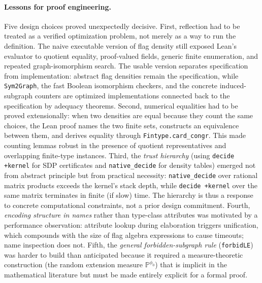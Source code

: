 \documentclass{article}
\newcommand{\lean}[1]{\texttt{#1}}
\begin{document}
\paragraph{Lessons for proof engineering.}
Five design choices proved unexpectedly decisive.  First, reflection had to be
treated as a verified optimization problem, not merely as a way to run the
definition.  The naive executable version of flag density still exposed
Lean's evaluator to quotient equality, proof-valued fields, generic finite
enumeration, and repeated graph-isomorphism search.  The usable version
separates specification from implementation: abstract flag densities remain the
specification, while \lean{Sym2Graph}, the fast Boolean isomorphism checkers,
and the concrete induced-subgraph counters are optimized implementations
connected back to the specification by adequacy theorems.  Second, numerical
equalities had to be proved extensionally: when two densities are equal because
they count the same choices, the Lean proof names the two finite sets,
constructs an equivalence between them, and derives equality through
\lean{Fintype.card\_congr}.  This made counting lemmas robust in the presence
of quotient representatives and overlapping finite-type instances.  Third, the
\emph{trust hierarchy} (using \lean{decide +kernel} for SDP certificates and
\lean{native\_decide} for density tables) emerged not from abstract principle
but from practical necessity: \lean{native\_decide} over rational matrix
products exceeds the kernel's stack depth, while \lean{decide +kernel} over
the same matrix terminates in finite (if slow) time.  The hierarchy is thus a
response to concrete computational constraints, not a prior design commitment.
Fourth, \emph{encoding structure in names} rather than type-class attributes
was motivated by a performance observation: attribute lookup during elaboration
triggers unification, which compounds with the size of flag algebra expressions
to cause timeouts; name inspection does not.  Fifth, the \emph{general
forbidden-subgraph rule} (\lean{forbidLE}) was harder to build than anticipated
because it required a measure-theoretic construction (the random extension
measure $\mathbb{P}^{\phi_0}$) that is implicit in the mathematical literature
but must be made entirely explicit for a formal proof.
\end{document}
